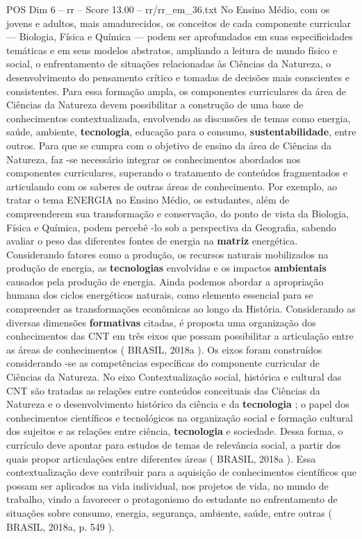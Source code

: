 \begin{textsample}{POS Dim 6 – rr – Score 13.00 – rr/rr\_em\_36.txt}
No Ensino Médio, com os jovens e adultos, mais amadurecidos, os conceitos de cada componente curricular — Biologia, Física e Química — podem ser aprofundados em suas especificidades temáticas e em seus modelos abstratos, ampliando a leitura de mundo físico e social, o enfrentamento de situações relacionadas às Ciências da Natureza, o desenvolvimento do pensamento crítico e tomadas de decisões mais conscientes e consistentes.
Para essa formação ampla, os componentes curriculares da área de Ciências da Natureza devem possibilitar a construção de uma base de conhecimentos contextualizada, envolvendo as discussões de temas como energia, saúde, ambiente, \textbf{tecnologia}, educação para o consumo, \textbf{sustentabilidade}, entre outros.
Para que se cumpra com o objetivo de ensino da área de Ciências da Natureza, faz -se necessário integrar os conhecimentos abordados nos componentes curriculares, superando o tratamento de conteúdos fragmentados e articulando com os saberes de outras áreas de conhecimento.
Por exemplo, ao tratar o tema ENERGIA no Ensino Médio, os estudantes, além de compreenderem sua transformação e conservação, do ponto de vista da Biologia, Física e Química, podem percebê -lo sob a perspectiva da Geografia, sabendo avaliar o peso das diferentes fontes de energia na \textbf{matriz} energética.
Considerando fatores como a produção, os recursos naturais mobilizados na produção de energia, as \textbf{tecnologias} envolvidas e os impactos \textbf{ambientais} causados pela produção de energia.
Ainda podemos abordar a apropriação humana dos ciclos energéticos naturais, como elemento essencial para se compreender as transformações econômicas ao longo da História.
Considerando as diversas dimensões \textbf{formativas} citadas, é proposta uma organização dos conhecimentos das CNT em três eixos que possam possibilitar a articulação entre as áreas de conhecimentos ( BRASIL, 2018a ).
Os eixos foram construídos considerando -se as competências específicas do componente curricular de Ciências da Natureza.
No eixo Contextualização social, histórica e cultural das CNT são tratadas as relações entre conteúdos conceituais das Ciências da Natureza e o desenvolvimento histórico da ciência e da \textbf{tecnologia} ; o papel dos conhecimentos científicos e tecnológicos na organização social e formação cultural dos sujeitos e as relações entre ciência, \textbf{tecnologia} e sociedade.
Dessa forma, o currículo deve apontar para estudos de temas de relevância social, a partir dos quais propor articulações entre diferentes áreas ( BRASIL, 2018a ).
Essa contextualização deve contribuir para a aquisição de conhecimentos científicos que possam ser aplicados na vida individual, nos projetos de vida, no mundo de trabalho, vindo a favorecer o protagonismo do estudante no enfrentamento de situações sobre consumo, energia, segurança, ambiente, saúde, entre outras ( BRASIL, 2018a, p. 549 ).

\end{textsample}
